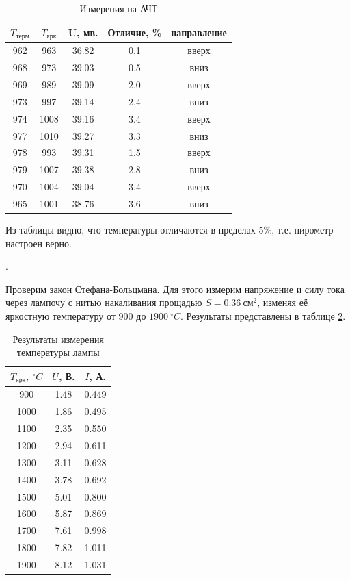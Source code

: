 \documentclass[a4paper, 12pt]{article}
\newcounter{Points}
\newcommand{\point}{\arabic{Points}. \addtocounter{Points}{1}}
\begin{document}
\begin{table}[H]
    \centering
    \begin{tabular}{|c|c|c|c|c|}
        \hline
        $T_{терм}$ & $T_{ярк}$ & U, мв. & Отличие, \% & направление \\ \hline
        962	&  963	& 36.82	& 0.1	 & вверх	 \\ \hline
        968	&  973	& 39.03	& 0.5	 & вниз 	 \\ \hline
        969	&  989	& 39.09	& 2.0	 & вверх	 \\ \hline
        973	&  997	& 39.14	& 2.4	 & вниз 	 \\ \hline
        974	& 1008	& 39.16	& 3.4	 & вверх	 \\ \hline
        977	& 1010	& 39.27	& 3.3	 & вниз 	 \\ \hline
        978	&  993	& 39.31	& 1.5	 & вверх	 \\ \hline
        979	& 1007	& 39.38	& 2.8	 & вниз 	 \\ \hline
        970	& 1004	& 39.04	& 3.4	 & вверх	 \\ \hline
        965	& 1001	& 38.76	& 3.6	 & вниз 	 \\ \hline
    \end{tabular}
    \caption {Измерения на АЧТ}
    \label{tab:black_body}
\end{table}

Из таблицы видно, что температуры отличаются в пределах $5\%$, т.е. пирометр настроен верно. 

\point Проверим закон Стефана-Больцмана. Для этого измерим напряжение и силу тока через лампочу с нитью накаливания прощадью $S = 0.36 ~ см^2$, изменяя её яркостную температуру от $900$ до $1900 ~^\circ C$. Результаты представлены в таблице \ref{tab:lamp}.

\begin{table}[H]
    \centering
    \begin{tabular}{|c|c|c|}
        \hline
        $T_{ярк}, ~^\circ C$ & $U$, В. & $I$, А. \\ \hline
        900	    & 1.48	 & 0.449 \\ \hline
        1000	 & 1.86	 & 0.495 \\ \hline
        1100	 & 2.35	 & 0.550 \\ \hline
        1200	 & 2.94	 & 0.611 \\ \hline
        1300	 & 3.11	 & 0.628 \\ \hline
        1400	 & 3.78	 & 0.692 \\ \hline
        1500	 & 5.01	 & 0.800 \\ \hline
        1600	 & 5.87	 & 0.869 \\ \hline
        1700	 & 7.61	 & 0.998 \\ \hline
        1800	 & 7.82	 & 1.011 \\ \hline
        1900	 & 8.12	 & 1.031 \\ \hline
    \end{tabular}
    \caption {Результаты измерения температуры лампы}
    \label{tab:lamp}
\end{table}
\end{document}
